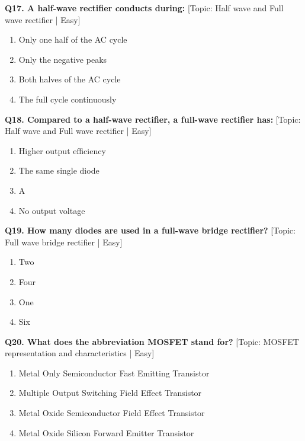 \noindent\textbf{Q17. A half-wave rectifier conducts during:} \hfill [Topic: Half wave and Full wave rectifier | Easy]
\begin{enumerate}[label=(\alph*),topsep=2pt,itemsep=1pt,partopsep=0pt,parsep=0pt]
    \item {Only one half of the AC cycle}
    \item {Only the negative peaks}
    \item {Both halves of the AC cycle}
    \item {The full cycle continuously}
\end{enumerate}
\vspace{2mm}

\noindent\textbf{Q18. Compared to a half-wave rectifier, a full-wave rectifier has:} \hfill [Topic: Half wave and Full wave rectifier | Easy]
\begin{enumerate}[label=(\alph*),topsep=2pt,itemsep=1pt,partopsep=0pt,parsep=0pt]
    \item {Higher output efficiency}
    \item {The same single diode}
    \item {A}
    \item {No output voltage}
\end{enumerate}
\vspace{2mm}

\noindent\textbf{Q19. How many diodes are used in a full-wave bridge rectifier?} \hfill [Topic: Full wave bridge rectifier | Easy]
\begin{enumerate}[label=(\alph*),topsep=2pt,itemsep=1pt,partopsep=0pt,parsep=0pt]
    \item {Two}
    \item {Four}
    \item {One}
    \item {Six}
\end{enumerate}
\vspace{2mm}

\noindent\textbf{Q20. What does the abbreviation MOSFET stand for?} \hfill [Topic: MOSFET representation and characteristics | Easy]
\begin{enumerate}[label=(\alph*),topsep=2pt,itemsep=1pt,partopsep=0pt,parsep=0pt]
    \item {Metal Only Semiconductor Fast Emitting Transistor}
    \item {Multiple Output Switching Field Effect Transistor}
    \item {Metal Oxide Semiconductor Field Effect Transistor}
    \item {Metal Oxide Silicon Forward Emitter Transistor}
\end{enumerate}
\vspace{2mm}


